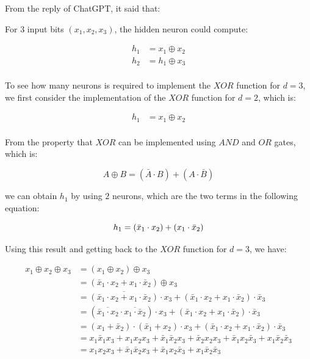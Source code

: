 \documentclass{article}
\begin{document}
From the reply of ChatGPT, it said that:
\bigskip

For $3$ input bits $(x_1, x_2, x_3)$, the hidden neuron could compute:

\begin{align*}
h_1 &= x_1 \oplus x_2 \\
h_2 &= h_1 \oplus x_3 \\
\end{align*}

To see how many neurons is required to implement the $XOR$ function for $d = 3$, 
we first consider the implementation of the $XOR$ function for $d = 2$, which is:

\begin{align*}
h_1 &= x_1 \oplus x_2 \\
\end{align*}

From the property that $XOR$ can be implemented using $AND$ and $OR$ gates, which is:

\begin{equation*}
A \oplus B = ( \bar{A} \cdot B) + (A \cdot \bar{B})
\end{equation*}

we can obtain $h_1$ by using $2$ neurons, which are the two terms in the following equation:

\begin{equation*}
h_1 = ( \bar{x}_1 \cdot x_2) + (x_1 \cdot \bar{x}_2) \\
\end{equation*}

Using this result and getting back to the $XOR$ function for $d = 3$, we have:

\begin{align*}
    x_1 \oplus x_2 \oplus x_3
    &= (x_1 \oplus x_2) \oplus x_3 \\
    &= (\bar{x}_1 \cdot x_2 + x_1 \cdot \bar{x}_2) \oplus x_3 \\
    &= \overline{(\bar{x}_1 \cdot x_2 + x_1 \cdot \bar{x}_2)} \cdot x_3 + (\bar{x}_1 \cdot x_2 + x_1 \cdot \bar{x}_2) \cdot \bar{x}_3 \\
    &= (\overline{\bar{x}_1 \cdot x_2} \cdot \overline{x_1 \cdot \bar{x}_2}) \cdot x_3 + (\bar{x}_1 \cdot x_2 + x_1 \cdot \bar{x}_2) \cdot \bar{x}_3 \\
    &= (x_1 + \bar{x}_2) \cdot (\bar{x}_1 + x_2) \cdot x_3 + (\bar{x}_1 \cdot x_2 + x_1 \cdot \bar{x}_2) \cdot \bar{x}_3 \\
    &= x_1\bar{x}_1x_3 + x_1x_2x_3 + \bar{x}_1\bar{x}_2x_3 + \bar{x}_2x_2x_3 + \bar{x}_1x_2\bar{x}_3 + x_1\bar{x}_2\bar{x}_3 \\
    &= x_1x_2x_3 + \bar{x}_1\bar{x}_2x_3 + \bar{x}_1x_2\bar{x}_3 + x_1\bar{x}_2\bar{x}_3 \\
\end{align*}
\end{document}
